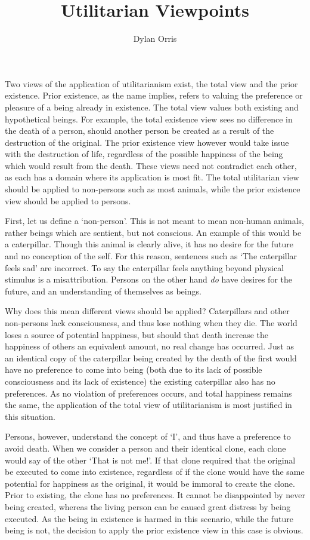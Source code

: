 \documentclass[12pt]{article}
\begin{document}
\title{Utilitarian Viewpoints}
\author{Dylan Orris}

\maketitle

Two views of the application of utilitarianism exist, the total view and the prior existence. Prior existence, as the name implies, refers to valuing the preference or pleasure of a being already in existence. The total view values both existing and hypothetical beings. For example, the total existence view sees no difference in the death of a person, should another person be created as a result of the destruction of the original. The prior existence view however would take issue with the destruction of life, regardless of the possible happiness of the being which would result from the death. These views need not contradict each other, as each has a domain where its application is most fit. The total utilitarian view should be applied to non-persons such as most animals, while the prior existence view should be applied to persons.

First, let us define a `non-person'. This is not meant to mean non-human animals, rather beings which are sentient, but not conscious. An example of this would be a caterpillar. Though this animal is clearly alive, it has no desire for the future and no conception of the self. For this reason, sentences such as `The caterpillar feels sad' are incorrect. To say the caterpillar feels anything beyond physical stimulus is a misattribution. Persons on the other hand \textit{do} have desires for the future, and an understanding of themselves as beings.

Why does this mean different views should be applied? Caterpillars and other non-persons lack consciousness, and thus lose nothing when they die. The world loses a source of potential happiness, but should that death increase the happiness of others an equivalent amount, no real change has occurred. Just as an identical copy of the caterpillar being created by the death of the first would have no preference to come into being (both due to its lack of possible consciousness and its lack of existence) the existing caterpillar also has no preferences. As no violation of preferences occurs, and total happiness remains the same, the application of the total view of utilitarianism is most justified in this situation.

Persons, however, understand the concept of `I', and thus have a preference to avoid death. When we consider a person and their identical clone, each clone would say of the other `That is not me!'. If that clone required that the original be executed to come into existence, regardless of if the clone would have the same potential for happiness as the original, it would be immoral to create the clone. Prior to existing, the clone has no preferences. It cannot be disappointed by never being created, whereas the living person can be caused great distress by being executed. As the being in existence is harmed in this scenario, while the future being is not, the decision to apply the prior existence view in this case is obvious.
\end{document}
